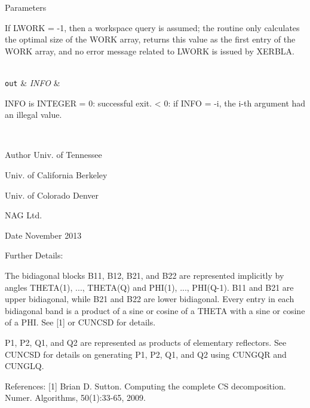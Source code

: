 \begin{DoxyParams}[1]{Parameters}
\begin{DoxyVerb}
          If LWORK = -1, then a workspace query is assumed; the routine
          only calculates the optimal size of the WORK array, returns
          this value as the first entry of the WORK array, and no error
          message related to LWORK is issued by XERBLA.\end{DoxyVerb}
\\
\hline
\mbox{\tt out}  & {\em I\+N\+F\+O} & \begin{DoxyVerb}          INFO is INTEGER
          = 0:  successful exit.
          < 0:  if INFO = -i, the i-th argument had an illegal value.\end{DoxyVerb}
 \\
\hline
\end{DoxyParams}
\begin{DoxyAuthor}{Author}
Univ. of Tennessee 

Univ. of California Berkeley 

Univ. of Colorado Denver 

N\+A\+G Ltd. 
\end{DoxyAuthor}
\begin{DoxyDate}{Date}
November 2013 
\end{DoxyDate}
\begin{DoxyParagraph}{Further Details\+: }
\begin{DoxyVerb}  The bidiagonal blocks B11, B12, B21, and B22 are represented
  implicitly by angles THETA(1), ..., THETA(Q) and PHI(1), ...,
  PHI(Q-1). B11 and B21 are upper bidiagonal, while B21 and B22 are
  lower bidiagonal. Every entry in each bidiagonal band is a product
  of a sine or cosine of a THETA with a sine or cosine of a PHI. See
  [1] or CUNCSD for details.

  P1, P2, Q1, and Q2 are represented as products of elementary
  reflectors. See CUNCSD for details on generating P1, P2, Q1, and Q2
  using CUNGQR and CUNGLQ.\end{DoxyVerb}
 
\end{DoxyParagraph}
\begin{DoxyParagraph}{References\+: }
\mbox{[}1\mbox{]} Brian D. Sutton. Computing the complete C\+S decomposition. Numer. Algorithms, 50(1)\+:33-\/65, 2009. 
\end{DoxyParagraph}
